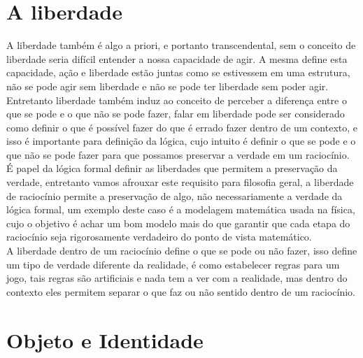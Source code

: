 \documentclass[10pt,a4paper]{report}
\begin{document}
\section{A liberdade}

\hspace{\baselineskip}

A liberdade também é algo a priori, e portanto transcendental, sem o conceito de liberdade seria difícil entender a nossa capacidade de agir. A mesma define esta capacidade, ação e liberdade estão juntas como se estivessem em uma estrutura, não se pode agir sem liberdade e não se pode ter liberdade sem poder agir. \\

Entretanto liberdade também induz ao conceito de perceber a diferença entre o que se pode e o que não se pode fazer, falar em liberdade pode ser considerado como definir o que é possível fazer do que é errado fazer dentro de um contexto, e isso é importante para definição da lógica, cujo intuito é definir o que se pode e o que não se pode fazer para que possamos preservar a verdade em um raciocínio.\\

É papel da lógica formal definir as liberdades que permitem a preservação da verdade, entretanto vamos afrouxar este requisito para filosofia geral, a liberdade de raciocínio permite a preservação de algo, não necessariamente a verdade da lógica formal, um exemplo deste caso é a modelagem matemática usada na física, cujo o objetivo é achar um bom modelo mais do que garantir que cada etapa do raciocínio seja rigorosamente verdadeiro do ponto de vista matemático.\\

A liberdade dentro de um raciocínio define o que se pode ou não fazer, isso define um tipo de verdade diferente da realidade, é como estabelecer regras para um jogo, tais regras são artificiais e nada tem a ver com a realidade, mas dentro do contexto eles permitem separar o que faz ou não sentido dentro de um raciocínio.


\section{Objeto e Identidade}
\end{document}
